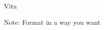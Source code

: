 \clearpage
{}  %
\begin{centering}
Vita\\
\end{centering}

\noindent  Note: Format in a way you want \\

\lipsum[1]
